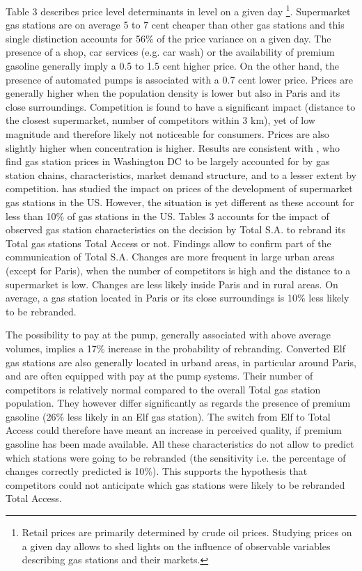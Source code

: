 \documentclass[english]{article}
\begin{document}
Table 3 describes price level determinants in level on a given day%
\footnote{Retail prices are primarily determined by crude oil prices. Studying prices on a given day allows to shed lights on the influence of observable variables describing gas stations and their markets.%
}. Supermarket gas stations are on average 5 to 7 cent cheaper than other gas stations and this single distinction accounts for 56\% of the price variance on a given day. The presence of a shop, car services (e.g. car wash) or the availability of premium gasoline generally imply a 0.5 to 1.5 cent higher price. On the other hand, the presence of automated pumps is associated with a 0.7 cent lower price. Prices are generally higher when the population density is lower but also in Paris and its close surroundings. Competition is found to have a significant impact (distance to the closest supermarket, number of competitors within 3 km), yet of low magnitude and therefore likely not noticeable for consumers. Prices are also slightly higher when concentration is higher. Results are consistent with \cite{HOS08}, who find gas station prices in Washington DC to be largely accounted for by gas station chains, characteristics, market demand structure, and to a lesser extent by competition. \cite{ZIM12} has studied the impact on prices of the development of supermarket gas stations in the US. However, the situation is yet different as these account for less than 10\% of gas stations in the US. Tables 3 accounts for the impact of observed gas station characteristics on the decision by Total S.A. to rebrand its Total gas stations Total Access or not. Findings allow to confirm part of the communication of Total S.A. Changes are more frequent in large urban areas (except for Paris), when the number of competitors is high and the distance to a supermarket is low. Changes are less likely inside Paris and in rural areas. On average, a gas station located in Paris or its close surroundings is 10\% less likely to be rebranded.

The possibility to pay at the pump, generally associated with above average volumes, implies a 17\% increase in the probability of rebranding. Converted Elf gas stations are also generally located in urband areas, in particular around Paris, and are often equipped with pay at the pump systems. Their number of competitors is relatively normal compared to the overall Total gas station population. They however differ significantly as regards the presence of premium gasoline (26\% less likely in an Elf gas station). The switch from Elf to Total Access could therefore have meant an increase in perceived quality, if premium gasoline has been made available. All these characteristics do not allow to predict which stations were going to be rebranded (the sensitivity i.e. the percentage of changes correctly predicted is 10\%). This supports the hypothesis that competitors could not anticipate which gas stations were likely to be rebranded Total Access.
\end{document}
